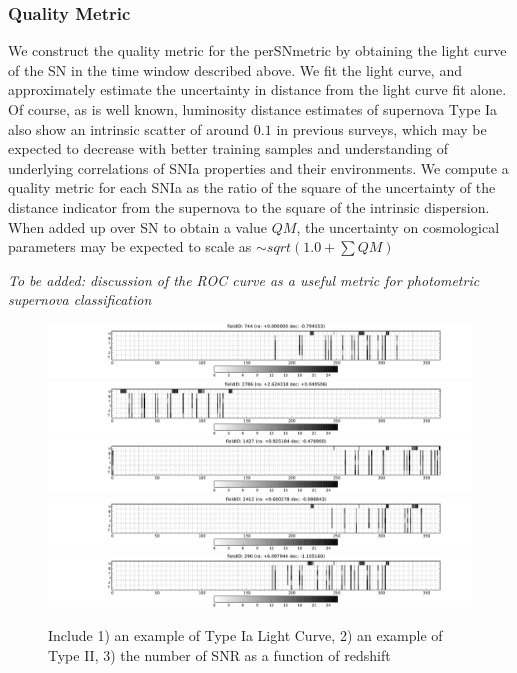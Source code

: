 \subsubsection{Quality Metric}
We construct the quality metric for the perSNmetric by obtaining the light curve of the SN in the time window described above. We fit the light curve, and 
approximately estimate the uncertainty in distance from the light curve fit alone. Of course, as is well known, luminosity distance estimates of supernova Type Ia also show an intrinsic scatter of around $0.1$ in previous surveys, which may be expected to decrease with better training samples and understanding 
of underlying correlations of SNIa properties and their environments. We compute a quality metric for each SNIa as the ratio of the square of the uncertainty of the distance indicator from the supernova to the square of the intrinsic dispersion. When added up over SN to obtain a value $QM$, the uncertainty on 
cosmological parameters may be expected to scale as $\sim sqrt(1.0 + \sum QM)$

\emph{To be added: discussion of the ROC curve as a useful metric for photometric supernova 
classification}


\begin{figure}[!hb]
    \begin{minipage}[b]{\linewidth}
        \includegraphics[width=\textwidth]{figs/supernova/fig_firstSeason_0}
        \includegraphics[width=\textwidth]{figs/supernova/fig_firstSeason_1}
        \includegraphics[width=\textwidth]{figs/supernova/fig_firstSeason_2}
        \includegraphics[width=\textwidth]{figs/supernova/fig_firstSeason_3}
        \includegraphics[width=\textwidth]{figs/supernova/fig_firstSeason_4}
    \end{minipage}
\label{fig:opsimSummary}
\caption{Include 1) an example of Type Ia Light Curve, 2) an example of Type II, 3) the number of SNR as a function of
redshift}
\end{figure}


